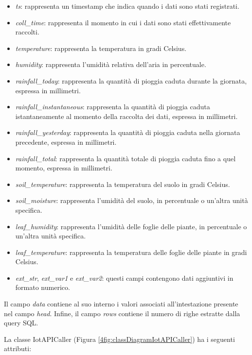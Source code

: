 \begin{itemize}
    \item \textit{ts}: rappresenta un timestamp che indica quando i dati sono stati registrati.
    \item \textit{coll\_time}: rappresenta il momento in cui i dati sono stati effettivamente raccolti.
    \item \textit{temperature}: rappresenta la temperatura in gradi Celsius.
    \item \textit{humidity}: rappresenta l'umidità relativa dell'aria in percentuale. 
    \item \textit{rainfall\_today}: rappresenta la quantità di pioggia caduta durante la giornata, espressa in millimetri.
    \item \textit{rainfall\_instantaneous}: rappresenta la quantità di pioggia caduta istantaneamente al momento della raccolta dei dati, espressa in millimetri.
    \item \textit{rainfall\_yesterday}: rappresenta la quantità di pioggia caduta nella giornata precedente, espressa in millimetri.
    \item \textit{rainfall\_total}: rappresenta la quantità totale di pioggia caduta fino a quel momento, espressa in millimetri.
    \item \textit{soil\_temperature}: rappresenta la temperatura del suolo in gradi Celsius.
    \item \textit{soil\_moisture}: rappresenta l'umidità del suolo, in percentuale o un'altra unità specifica.
    \item \textit{leaf\_humidity}: rappresenta l'umidità delle foglie delle piante, in percentuale o un'altra unità specifica.
    \item \textit{leaf\_temperature}: rappresenta la temperatura delle foglie delle piante in gradi Celsius.
    \item \textit{ext\_str}, \textit{ext\_var1} e \textit{ext\_var2}: questi campi contengono dati aggiuntivi in formato numerico.
\end{itemize}

Il campo \textit{data} contiene al suo interno i valori associati all'intestazione presente nel campo \textit{head}. Infine, il campo \textit{rows} contiene il numero di righe estratte dalla query SQL.

La classe IotAPICaller (Figura \ref{4fig:classDiagramIotAPICaller}) ha i seguenti attributi:


